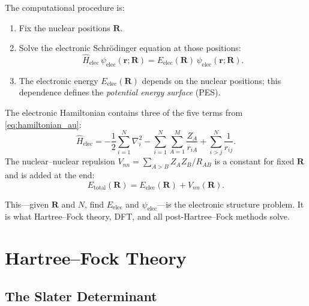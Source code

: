 \documentclass[11pt]{article}
\numberwithin{equation}{section}
\begin{document}
The computational procedure is:
\begin{enumerate}
\item Fix the nuclear positions $\mathbf{R}$.
\item Solve the electronic Schr\"{o}dinger equation at those positions:
\begin{equation}
\hat{H}_\text{elec}\,\psi_\text{elec}(\mathbf{r};\mathbf{R}) = E_\text{elec}(\mathbf{R})\,\psi_\text{elec}(\mathbf{r};\mathbf{R}).
\label{eq:elec_schrodinger}
\end{equation}
\item The electronic energy $E_\text{elec}(\mathbf{R})$ depends on the nuclear positions; this dependence defines the \emph{potential energy surface} (PES).
\end{enumerate}

The electronic Hamiltonian contains three of the five terms from \eqref{eq:hamiltonian_au}:
\begin{equation}
\hat{H}_\text{elec} = -\frac{1}{2}\sum_{i=1}^{N}\nabla_i^2 - \sum_{i=1}^{N}\sum_{A=1}^{M}\frac{Z_A}{r_{iA}} + \sum_{i>j}^{N}\frac{1}{r_{ij}}.
\label{eq:H_elec}
\end{equation}
The nuclear--nuclear repulsion $V_{nn} = \sum_{A>B}Z_AZ_B/R_{AB}$ is a constant for fixed $\mathbf{R}$ and is added at the end:
\begin{equation}
E_\text{total}(\mathbf{R}) = E_\text{elec}(\mathbf{R}) + V_{nn}(\mathbf{R}).
\end{equation}

This---given $\mathbf{R}$ and $N$, find $E_\text{elec}$ and $\psi_\text{elec}$---is the electronic structure problem. It is what Hartree--Fock theory, DFT, and all post-Hartree--Fock methods solve.


\section{Hartree--Fock Theory}
\label{sec:HF}

\subsection{The Slater Determinant}
\end{document}
